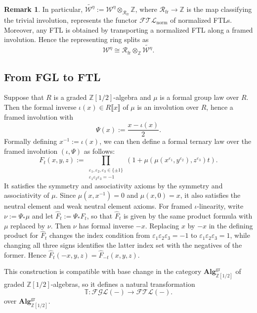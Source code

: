 \documentclass[a4paper]{amsart}
\theoremstyle{plain}
\theoremstyle{definition}
\newtheorem{remark}[subsubsection]{Remark}
\newcommand{\W}{\mathcal{W}^{\eta}}
\newcommand{\ZZ}{\mathbb{Z}}
\newcommand{\Rfr}{\mathcal{R}_{\mathrm{fr}}}
\begin{document}
\begin{remark}\label{rem:walter-ring-splitting}
	In particular, $\widetilde{\W}:=\W \otimes_{\Rfr} \ZZ$, where $\Rfr \to \ZZ$ is the map classifying the trivial involution, represents the functor $\mathcal{FTL}_{\mathrm{norm}}$ of normalized FTLs. Moreover, any FTL is obtained by transporting a normalized FTL along a framed involution. Hence the representing ring splits as
	\[
		\W \cong \Rfr \otimes_{\ZZ} \widetilde{\W}.
	\]
\end{remark}

\subsection{From FGL to FTL}\label{subsec:from-fgl-to-ftl}

Suppose that $R$ is a graded $\ZZ[1/2]$-algebra and $\mu$ is a formal group law over $R$. Then the formal inverse $\iota(x) \in R \llbracket x \rrbracket$ of $\mu$ is an involution over $R$, hence a framed involution with
\[
	\Psi(x):=\frac{x-\iota(x)}{2}.
\]
Formally defining $x^{-1}:=\iota(x)$, we can then define a formal ternary law over the framed involution $(\iota, \Psi)$ as follows:
\[
	F_t(x,y,z):=\prod_{\substack{\varepsilon_1,\varepsilon_2,\varepsilon_3\in\{\pm 1\}\\ \varepsilon_1\varepsilon_2\varepsilon_3=-1}} \left( 1 +  \mu(\mu(x^{\varepsilon_1},y^{\varepsilon_2}),z^{\varepsilon_3}) t\right).
\]
It satisfies the symmetry and associativity axioms by the symmetry and associativity of $\mu$. Since $\mu(x,x^{-1}) = 0$ and $\mu(x,0) = x$, it also satisfies the neutral element and weak neutral element axioms. For framed $\iota$-linearity, write $\nu:=\Psi_*\mu$ and let $\widehat{F}_t:=\Psi_*F_t$, so that $\widehat{F}_t$ is given by the same product formula with $\mu$ replaced by $\nu$. Then $\nu$ has formal inverse $-x$. Replacing $x$ by $-x$ in the defining product for $\widehat{F}_t$ changes the index condition from $\varepsilon_1\varepsilon_2\varepsilon_3=-1$ to $\varepsilon_1\varepsilon_2\varepsilon_3=1$, while changing all three signs identifies the latter index set with the negatives of the former. Hence $\widehat{F}_t(-x,y,z)=\widehat{F}_{-t}(x,y,z)$.

This construction is compatible with base change in the category $\mathbf{Alg}^{\mathrm{gr}}_{\ZZ[1/2]}$ of graded $\ZZ[1/2]$-algebras, so it defines a natural transformation
\[
	\mathbb{T}: \mathcal{FGL}(-) \to \mathcal{FTL}(-).
\]
over $\mathbf{Alg}^{\mathrm{gr}}_{\ZZ[1/2]}$.
\end{document}
